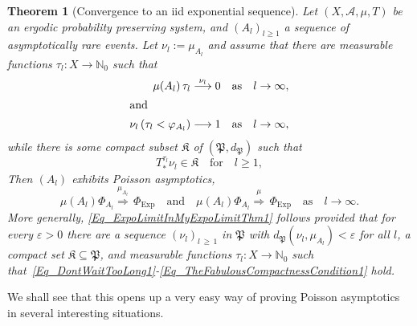 \documentclass[10pt]{amsart}
\newtheorem{theo}{Theorem}[section]
\theoremstyle{definition}\newtheorem{defi}[theo]{Definition}\newtheorem{rema}[theo]{Remark}\newtheorem{exam}[theo]{Example}\newtheorem{exem}[theo]{Example}\newtheorem{nota}[theo]{Notation}
\newcommand{\clA}{\mathcal{A}}
\newcommand{\Expl}{\mathrm{Exp}}
\newcommand{\frkK}{\mathfrak{K}}
\newcommand{\frkP}{\mathfrak{P}}
\newcommand{\bbN}{\mathbb{N}}
\begin{document}
\begin{theo}[{Convergence to an iid exponential sequence}]\label{T_MOreFlexiblePoissonLimitFromCompactness}
Let $(X,\clA,\mu,T)$ be an ergodic probability preserving system, and $(A_{l})_{l\geq1}$ a sequence of asymptotically rare events. Let $\nu_{l}:=\mu_{A_{l}}$ and assume that there are measurable functions $\tau_{l}:X\rightarrow\bbN_{0}$ such that
\begin{align}
\mu(A_{l})\,\tau_{l}\overset{\nu_{l}}{\longrightarrow}0 &\quad\text{as}\quad l\rightarrow\infty, \label{Eq_DontWaitTooLong1}
\\
\intertext{and}
\nu_{l}\left(\tau_{l}<\varphi_{A_{l}}\right) \longrightarrow1 &\quad\text{as}\quad l\rightarrow\infty,\label{Eq_HardlyAnyReturnsUpToTimeM1} 
\end{align}
while there is some compact subset $\frkK$ of $(\frkP,d_{\frkP})$ such that
\begin{equation}\label{Eq_TheFabulousCompactnessCondition1}
T_{\ast}^{\tau_{l}}\nu_{l}\in\frkK\quad\text{for}\quad l\geq1,
\end{equation}
Then $(A_{l})$ exhibits Poisson asymptotics,
\begin{equation}\label{Eq_ExpoLimitInMyExpoLimitThm1}
\mu(A_{l})\Phi_{A_{l}}\overset{\mu_{A_{l}}}{\Longrightarrow}\,\Phi _{\Expl}\quad\text{and}\quad\mu(A_{l})\Phi_{A_{l}}\overset{\mu }{\Longrightarrow}\,\Phi_{\Expl}\quad\text{as}\quad l\rightarrow
\infty. 
\end{equation}
More generally, \eqref{Eq_ExpoLimitInMyExpoLimitThm1} follows provided that for every $\varepsilon>0$ there are a sequence $(\nu_{l})_{l\,\geq\,1}$ in $\frkP$ with $d_{\frkP}(\nu_{l},\mu_{A_{l}})<\varepsilon$ for all $l$, a compact set $\frkK\subseteq\frkP$, and measurable functions $\tau_{l}:X\rightarrow\bbN_{0}$ such that~\eqref{Eq_DontWaitTooLong1}-\eqref{Eq_TheFabulousCompactnessCondition1} hold.
\end{theo}




We shall see that this opens up a very easy way of proving Poisson asymptotics in several interesting situations.

\end{document}
